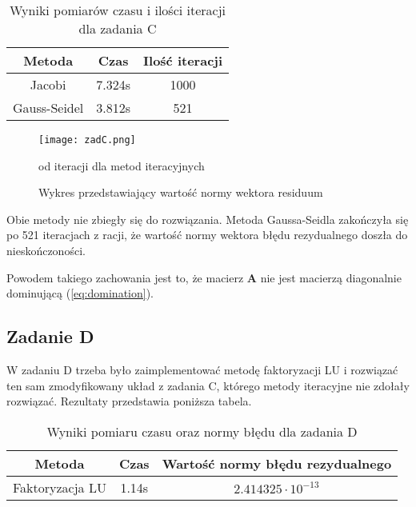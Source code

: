 \documentclass{article}
\begin{document}
\begin{table}[H]
    \begin{center}
        \begin{tabular}{| c | c | c |} 
        \hline
        Metoda & Czas & Ilość iteracji \\
        \hline
        Jacobi & 7.324s & 1000 \\
        \hline
        Gauss-Seidel & 3.812s & 521 \\
        \hline
        \end{tabular}
        \caption{Wyniki pomiarów czasu i ilości iteracji dla zadania C}
    \end{center}
\end{table}

\begin{figure}[H]
    \texttt{[image: zadC.png]}
    \centering
    \caption{Wykres przedstawiający wartość normy wektora residuum}
    {od iteracji dla metod iteracyjnych}
\end{figure}

Obie metody nie zbiegły się do rozwiązania. Metoda Gaussa-Seidla zakończyła się
po 521 iteracjach z racji, że wartość normy wektora błędu rezydualnego doszła do nieskończoności.

Powodem takiego zachowania jest to, że macierz $\boldsymbol{A}$ nie jest
macierzą diagonalnie dominującą (\ref {eq:domination}).

\subsection{Zadanie D}
W zadaniu D trzeba było zaimplementować metodę faktoryzacji LU
i rozwiązać ten sam zmodyfikowany układ z zadania C, którego metody iteracyjne
nie zdołały rozwiązać. Rezultaty przedstawia poniższa tabela.

\begin{table}[H]
    \begin{center}
        \begin{tabular}{| c | c | c |} 
        \hline
        Metoda & Czas & Wartość normy błędu rezydualnego \\
        \hline
        \rule{0pt}{2.5ex}   
        Faktoryzacja LU & 1.14s & $2.414325 \cdot 10^{-13}$  \\
        \hline
        \end{tabular}
        \caption{Wyniki pomiaru czasu oraz normy błędu dla zadania D}
    \end{center}
\end{table}
\end{document}

